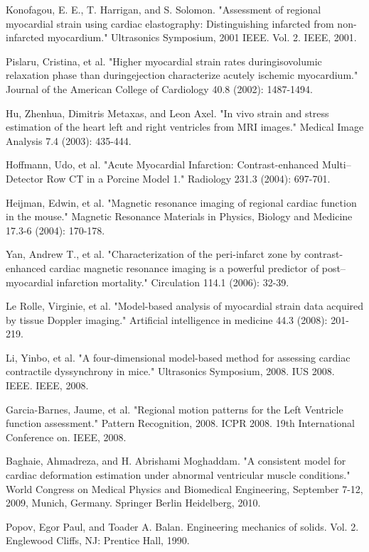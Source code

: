 \documentclass{jicspack}
\begin{document}
\begin{thebibliography}{99}
 Konofagou, E. E., T. Harrigan, and S. Solomon. "Assessment of regional myocardial strain using cardiac elastography: Distinguishing infarcted from non-infarcted myocardium." Ultrasonics Symposium, 2001 IEEE. Vol. 2. IEEE, 2001.

 Pislaru, Cristina, et al. "Higher myocardial strain rates duringisovolumic relaxation phase than duringejection characterize acutely ischemic myocardium." Journal of the American College of Cardiology 40.8 (2002): 1487-1494.

 Hu, Zhenhua, Dimitris Metaxas, and Leon Axel. "In vivo strain and stress estimation of the heart left and right ventricles from MRI images." Medical Image Analysis 7.4 (2003): 435-444.

 Hoffmann, Udo, et al. "Acute Myocardial Infarction: Contrast-enhanced Multi–Detector Row CT in a Porcine Model 1." Radiology 231.3 (2004): 697-701.

 Heijman, Edwin, et al. "Magnetic resonance imaging of regional cardiac function in the mouse." Magnetic Resonance Materials in Physics, Biology and Medicine 17.3-6 (2004): 170-178.

 Yan, Andrew T., et al. "Characterization of the peri-infarct zone by contrast-enhanced cardiac magnetic resonance imaging is a powerful predictor of post–myocardial infarction mortality." Circulation 114.1 (2006): 32-39.

 Le Rolle, Virginie, et al. "Model-based analysis of myocardial strain data acquired by tissue Doppler imaging." Artificial intelligence in medicine 44.3 (2008): 201-219.

 Li, Yinbo, et al. "A four-dimensional model-based method for assessing cardiac contractile dyssynchrony in mice." Ultrasonics Symposium, 2008. IUS 2008. IEEE. IEEE, 2008.

 Garcia-Barnes, Jaume, et al. "Regional motion patterns for the Left Ventricle function assessment." Pattern Recognition, 2008. ICPR 2008. 19th International Conference on. IEEE, 2008.

 Baghaie, Ahmadreza, and H. Abrishami Moghaddam. "A consistent model for cardiac deformation estimation under abnormal ventricular muscle conditions." World Congress on Medical Physics and Biomedical Engineering, September 7-12, 2009, Munich, Germany. Springer Berlin Heidelberg, 2010.

 Popov, Egor Paul, and Toader A. Balan. Engineering mechanics of solids. Vol. 2. Englewood Cliffs, NJ: Prentice Hall, 1990.


\end{thebibliography}
\end{document}
